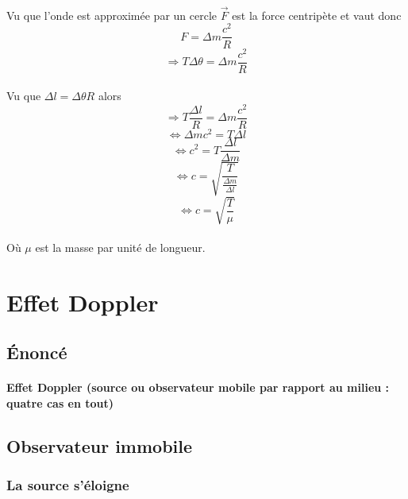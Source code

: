 \documentclass[a4paper]{article}
\begin{document}
\paragraph{}Vu que l'onde est approximée par un cercle $\vec{F}$ est la force centripète et vaut donc
\[F=\Delta m \frac{c^2}{R}\]
\[\Rightarrow T\Delta \theta=\Delta m \frac{c^2}{R}\]
\paragraph{}Vu que $\Delta l=\Delta \theta R$ alors
\[\Rightarrow T\frac{\Delta l}{R}=\Delta m \frac{c^2}{R}\]
\[\Leftrightarrow \Delta m c^2=T\Delta l\]
\[\Leftrightarrow c^2=T\frac{\Delta l}{\Delta m}\]
\[\Leftrightarrow c=\sqrt{\frac{T}{\frac{\Delta m}{\Delta l}}}\]
\[\Leftrightarrow c=\sqrt{\frac{T}{\mu}}\]
\paragraph{}Où $\mu$ est la masse par unité de longueur.
\section{Effet Doppler}
\subsection{Énoncé}
\paragraph{}\textbf{Effet Doppler (source ou observateur mobile par rapport au milieu : quatre cas en tout)}
\subsection{Observateur immobile}
\subsubsection{La source s'éloigne}
\end{document}
